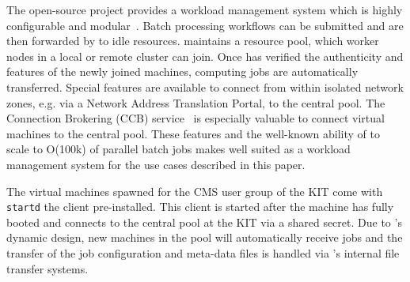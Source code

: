 The open-source \HTCondor project provides a workload management system which is highly configurable and modular~\cite{HTCondor}. Batch processing workflows can be submitted and are then forwarded by \HTCondor to idle resources. \HTCondor maintains a resource pool, which worker nodes in a local or remote cluster can join. Once \HTCondor has verified the authenticity and features of the newly joined machines, computing jobs are automatically transferred. Special features are available to connect from within isolated network zones, e.g. via a Network Address Translation Portal, to the central \HTCondor pool. The Connection Brokering (CCB) service~\cite{HTCondorCCB} is especially valuable to connect virtual machines to the central pool. These features and the well-known ability of \HTCondor to scale to O(100k) of parallel batch jobs makes \HTCondor well suited as a workload management system for the use cases described in this paper.


The virtual machines spawned for the CMS user group of the KIT come with \texttt{startd} the \HTCondor client pre-installed. This client is started after the machine has fully booted and connects to the central \HTCondor pool at the KIT via a shared secret. Due to \HTCondor's dynamic design, new machines in the pool will automatically receive jobs and the transfer of the job configuration and meta-data files is handled via \HTCondor's internal file transfer systems.
